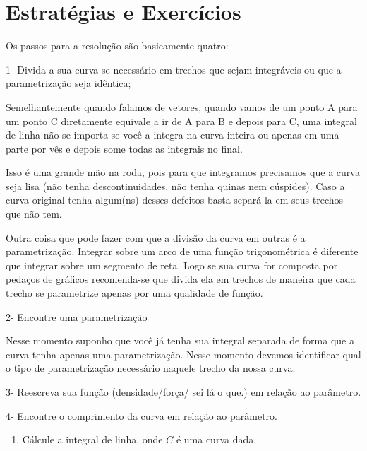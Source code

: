 \section*{Estratégias e Exercícios}

Os passos para a resolução são basicamente quatro:

1- Divida a sua curva se necessário em trechos que sejam integráveis ou que a parametrização seja idêntica;

Semelhantemente quando falamos de vetores,  quando vamos de um ponto A para um ponto C diretamente equivale a ir de A para B e depois para C, uma integral de linha não se importa se você a integra na curva inteira ou apenas em uma parte por vês e depois some todas as integrais no final.

Isso é uma grande mão na roda, pois para que integramos precisamos que a curva seja lisa (não tenha descontinuidades, não tenha quinas nem cúspides). Caso a curva original tenha algum(ns) desses defeitos basta separá-la em seus trechos que não tem.

Outra coisa que pode fazer com que a divisão da curva em outras é a parametrização. Integrar sobre um arco de uma função trigonométrica é diferente que integrar sobre um segmento de reta. Logo se sua curva for composta por pedaços de gráficos recomenda-se que divida ela em trechos de maneira que cada trecho se parametrize apenas por uma qualidade de função.

2- Encontre uma parametrização

Nesse momento suponho que você já tenha sua integral separada de forma que a curva tenha apenas uma parametrização. Nesse momento devemos identificar qual o tipo de parametrização necessário naquele trecho da nossa curva.

3- Reescreva sua função (densidade/força/ sei lá o que.) em relação ao parâmetro.

4- Encontre o comprimento da curva em relação ao parâmetro.

\begin{enumerate}
\item Cálcule a integral de linha, onde $C$ é uma curva dada.
\end{enumerate}

